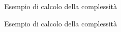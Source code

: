 \documentclass{beamer}
\begin{document}
\begin{frame}{Esempio di calcolo della complessit\`a}{}
\end{frame}

\begin{frame}{Esempio di calcolo della complessità}{}
\end{frame}
\end{document}
